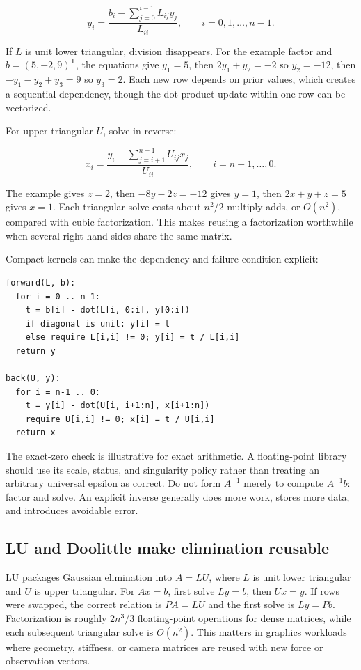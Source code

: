 \[
y_i=\frac{b_i-\sum_{j=0}^{i-1}L_{ij}y_j}{L_{ii}},\qquad i=0,1,\ldots,n-1.
\]

If \(L\) is unit lower triangular, division disappears. For the example factor and \(b=(5,-2,9)^\mathsf T\), the equations give \(y_1=5\), then \(2y_1+y_2=-2\) so \(y_2=-12\), then \(-y_1-y_2+y_3=9\) so \(y_3=2\). Each new row depends on prior values, which creates a sequential dependency, though the dot-product update within one row can be vectorized.

For upper-triangular \(U\), solve in reverse:

\[
x_i=\frac{y_i-\sum_{j=i+1}^{n-1}U_{ij}x_j}{U_{ii}},\qquad i=n-1,\ldots,0.
\]

The example gives \(z=2\), then \(-8y-2z=-12\) gives \(y=1\), then \(2x+y+z=5\) gives \(x=1\). Each triangular solve costs about \(n^2/2\) multiply-adds, or \(O(n^2)\), compared with cubic factorization. This makes reusing a factorization worthwhile when several right-hand sides share the same matrix.

Compact kernels can make the dependency and failure condition explicit:

\begin{verbatim}
forward(L, b):
  for i = 0 .. n-1:
    t = b[i] - dot(L[i, 0:i], y[0:i])
    if diagonal is unit: y[i] = t
    else require L[i,i] != 0; y[i] = t / L[i,i]
  return y

back(U, y):
  for i = n-1 .. 0:
    t = y[i] - dot(U[i, i+1:n], x[i+1:n])
    require U[i,i] != 0; x[i] = t / U[i,i]
  return x
\end{verbatim}

The exact-zero check is illustrative for exact arithmetic. A floating-point library should use its scale, status, and singularity policy rather than treating an arbitrary universal epsilon as correct. Do not form \(A^{-1}\) merely to compute \(A^{-1}b\): factor and solve. An explicit inverse generally does more work, stores more data, and introduces avoidable error.

\subsection{LU and Doolittle make elimination reusable}\label{01-foundations-i-ch019-lu-and-doolittle-make-elimination-reusable}

LU packages Gaussian elimination into \(A=LU\), where \(L\) is unit lower triangular and \(U\) is upper triangular. For \(Ax=b\), first solve \(Ly=b\), then \(Ux=y\). If rows were swapped, the correct relation is \(PA=LU\) and the first solve is \(Ly=Pb\). Factorization is roughly \(2n^3/3\) floating-point operations for dense matrices, while each subsequent triangular solve is \(O(n^2)\). This matters in graphics workloads where geometry, stiffness, or camera matrices are reused with new force or observation vectors.


